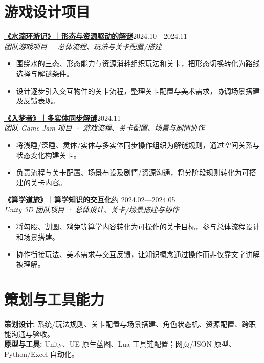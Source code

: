 \documentclass[a4paper,11pt]{article}
\newcommand{\resumeSubheading}[3]{\textbf{#1}\hfill{\small #3}\\{\small\textit{#2}}\par\vspace{3pt}}
\newcommand{\resumeItemListStart}{\begin{itemize}[leftmargin=13pt,label=\textbullet,itemsep=2.5pt,topsep=3pt,parsep=0pt]\fontsize{11pt}{15.5pt}\selectfont}
\newcommand{\resumeItemListEnd}{\end{itemize}\vspace{2pt}}
\newcommand{\resumeItem}[1]{\item #1}
\begin{document}
\section{游戏设计项目}
\resumeSubheading{\href{https://zukunft39.github.io/projects/water.html}{《水滴环游记》｜形态与资源驱动的解谜}}{团队游戏项目 · 总体流程、玩法与关卡配置/搭建}{2024.10—2024.11}
\resumeItemListStart
\resumeItem{围绕水的三态、形态能力与资源消耗组织玩法和关卡，把形态切换转化为路线选择与解谜条件。}
\resumeItem{设计逐步引入交互物件的关卡流程，整理关卡配置与美术需求，协调场景搭建及反馈表现。}
\resumeItemListEnd
\resumeSubheading{\href{https://zukunft39.github.io/projects/dream.html}{《入梦者》｜多实体同步解谜}}{团队 Game Jam 项目 · 游戏流程、关卡配置、场景与剧情协作}{2024.11}
\resumeItemListStart
\resumeItem{将浅睡/深睡、灵体/实体与多实体同步操作组织为解谜规则，通过空间关系与状态变化构建关卡。}
\resumeItem{负责流程与关卡配置、场景布设及剧情/资源沟通，将分阶段规则转化为可搭建的关卡内容。}
\resumeItemListEnd
\resumeSubheading{\href{https://zukunft39.github.io/projects/math.html}{《算学道旅》｜算学知识的交互化}}{Unity 3D 团队项目 · 总体设计、关卡/场景搭建与协作}{约 2024.02—2024.05}
\resumeItemListStart
\resumeItem{将勾股、割圆、鸡兔等算学内容转化为可操作的关卡目标，参与总体流程设计和场景搭建。}
\resumeItem{协作衔接玩法、美术需求与交互反馈，让知识概念通过操作而非仅靠文字讲解被理解。}
\resumeItemListEnd
\section{策划与工具能力}
{\fontsize{11pt}{15.5pt}\selectfont
\textbf{策划设计:} 系统/玩法规则、关卡配置与场景搭建、角色状态机、资源配置、跨职能沟通与验收。\\[2pt]
\textbf{原型与工具:} Unity、UE 原生蓝图、Lua 工具链配置；网页/JSON 原型、Python/Excel 自动化。\\[2pt]
}
\end{document}
